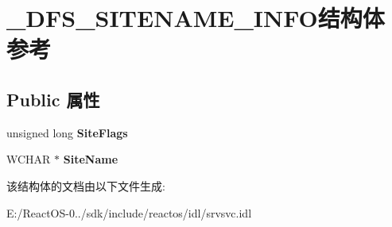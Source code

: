 \hypertarget{struct___d_f_s___s_i_t_e_n_a_m_e___i_n_f_o}{}\section{\+\_\+\+D\+F\+S\+\_\+\+S\+I\+T\+E\+N\+A\+M\+E\+\_\+\+I\+N\+F\+O结构体 参考}
\label{struct___d_f_s___s_i_t_e_n_a_m_e___i_n_f_o}
\subsection*{Public 属性}
\begin{DoxyCompactItemize}
\item 
\mbox{\label{struct___d_f_s___s_i_t_e_n_a_m_e___i_n_f_o_a828337a2a6604d100dfb4127e27f4a7a}} 
unsigned long {\bfseries Site\+Flags}
\item 
\mbox{\label{struct___d_f_s___s_i_t_e_n_a_m_e___i_n_f_o_a501176ee43ce31b359ce735d26969bfb}} 
W\+C\+H\+AR $\ast$ {\bfseries Site\+Name}
\end{DoxyCompactItemize}


该结构体的文档由以下文件生成\+:\begin{DoxyCompactItemize}
\item 
E\+:/\+React\+O\+S-\/0../sdk/include/reactos/idl/srvsvc.\+idl\end{DoxyCompactItemize}
